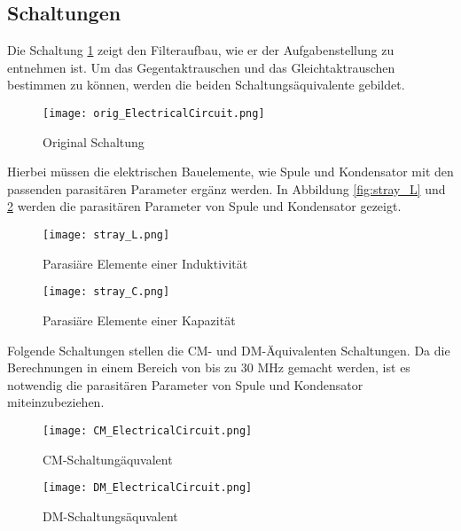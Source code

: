 \subsection{Schaltungen} \label{subsec:schaltungen}
Die Schaltung \ref{fig:orig_Schaltung}  zeigt den Filteraufbau, wie er der Aufgabenstellung zu entnehmen ist. Um das Gegentaktrauschen und das Gleichtaktrauschen bestimmen zu können, werden die beiden Schaltungsäquivalente gebildet. 
\begin{figure}[H]
	\centering
	\texttt{[image: orig\_ElectricalCircuit.png]}
	\caption{Original Schaltung \cite{aufgabenstellung}}
	\label{fig:orig_Schaltung}
\end{figure}
Hierbei müssen die elektrischen Bauelemente, wie Spule und Kondensator mit den passenden parasitären Parameter ergänz werden. In Abbildung \ref{fig:stray_L} und \ref{fig:stray_C} werden die parasitären Parameter von Spule und Kondensator gezeigt.
\begin{figure}[H]
	\begin{minipage}[h]{0.45\linewidth}
		\centering
		\texttt{[image: stray\_L.png]}
		\label{fig:stray_L}
		\caption{Parasiäre Elemente einer Induktivität \cite{aufgabenstellung}}
	\end{minipage}
	\begin{minipage}[h]{0.45\linewidth}
		\centering
		\texttt{[image: stray\_C.png]}
		\label{fig:stray_C}
		\caption{Parasiäre Elemente einer Kapazität \cite{aufgabenstellung}}
	\end{minipage}
\end{figure}
Folgende Schaltungen stellen die CM- und DM-Äquivalenten Schaltungen. Da die Berechnungen in einem Bereich von bis zu 30 MHz gemacht werden, ist es notwendig die parasitären Parameter von Spule und Kondensator miteinzubeziehen.

\begin{figure}[H]
	\centering
	\texttt{[image: CM\_ElectricalCircuit.png]}
	\caption{CM-Schaltungäquvalent \cite{aufgabenstellung}}
	\label{fig:CM-Schaltungäquivalent}
\end{figure}

\begin{figure}[H]
	\centering
	\texttt{[image: DM\_ElectricalCircuit.png]}
	\caption{DM-Schaltungsäquvalent \cite{aufgabenstellung}}
	\label{fig:DM-Schaltungsäquivalent}
\end{figure}
\newpage

